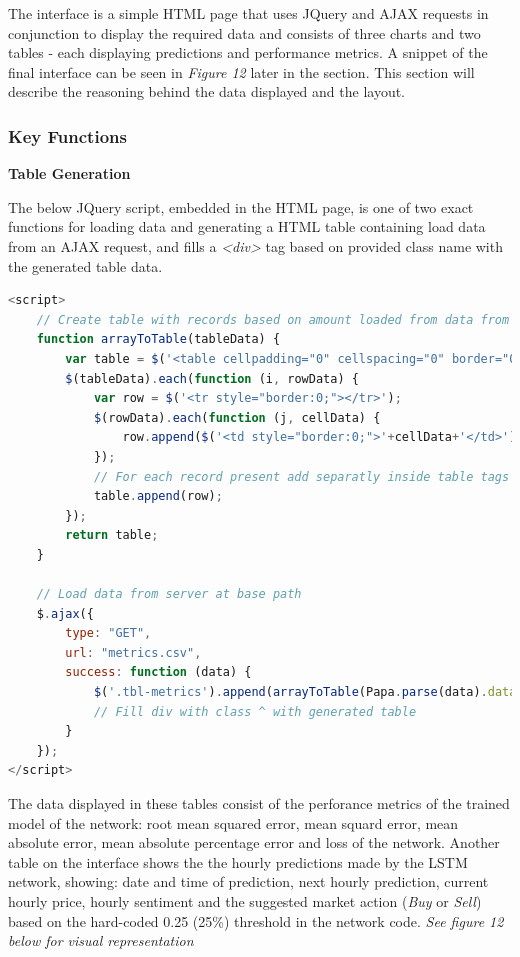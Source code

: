 \documentclass[oneside, 12pt]{article}
\begin{document}
		The interface is a simple HTML page that uses JQuery and AJAX requests in conjunction to display the required data and consists of three charts and two tables - each displaying predictions and performance metrics. A snippet of the final interface can be seen in \textit{Figure 12} later in the section. This section will describe the reasoning behind the data displayed and the layout.
		
		\subsubsection{Key Functions}
		
		\textbf{Table Generation}
		
		The below JQuery script, embedded in the HTML page, is one of two exact functions for loading data and generating a HTML table containing load data from an AJAX request, and fills a \textit{<div>} tag based on provided class name with the generated table data.  
		
		\begin{lstlisting}[language=JavaScript, caption=AJAX request and plotting performance data to HTML table]
<script>
	// Create table with records based on amount loaded from data from AJAX request
	function arrayToTable(tableData) {
		var table = $('<table cellpadding="0" cellspacing="0" border="0"></table');
		$(tableData).each(function (i, rowData) {
			var row = $('<tr style="border:0;"></tr>');
			$(rowData).each(function (j, cellData) {
				row.append($('<td style="border:0;">'+cellData+'</td>'));
			});
			// For each record present add separatly inside table tags
			table.append(row);
		});
		return table;
	}
	
	// Load data from server at base path
	$.ajax({
		type: "GET",
		url: "metrics.csv",
		success: function (data) {
			$('.tbl-metrics').append(arrayToTable(Papa.parse(data).data));
			// Fill div with class ^ with generated table
		}
	});
</script>
		\end{lstlisting}
		
		The data displayed in these tables consist of the perforance metrics of the trained model of the network: root mean squared error, mean squard error, mean absolute error, mean absolute percentage error and loss of the network. Another table on the interface shows the the hourly predictions made by the LSTM network, showing: date and time of prediction, next hourly prediction, current hourly price, hourly sentiment and the suggested market action (\textit{Buy} or \textit{Sell}) based on the hard-coded 0.25 (25\%) threshold in the network code. \textit{See figure 12 below for visual representation}
\newline
\end{document}

